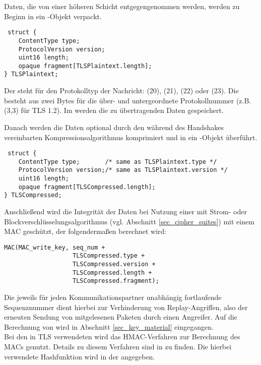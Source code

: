 Daten, die von einer höheren Schicht entgegengenommen werden, werden zu Beginn in ein -Objekt verpackt. 

\begin{lstlisting}
 struct {
	ContentType type;  
	ProtocolVersion version; 
	uint16 length;
	opaque fragment[TLSPlaintext.length];
} TLSPlaintext;
\end{lstlisting}

%

Der  steht für den Protokolltyp der Nachricht: \changecipherspecprotocol{} (20), \alertprotocol{} (21), \handshakeprotocol{} (22) oder \applicationdataprotocol{} (23). Die  besteht aus zwei Bytes für die über- und untergeordnete Protokollnummer (z.B. (3,3) für TLS 1.2). Im  werden die zu übertragenden Daten gespeichert.

Danach werden die Daten optional durch den während des Handshakes vereinbarten Kompressionsalgorithmus komprimiert und in ein -Objekt überführt.

\begin{lstlisting}
 struct {
	ContentType type;       /* same as TLSPlaintext.type */
	ProtocolVersion version;/* same as TLSPlaintext.version */
	uint16 length;
	opaque fragment[TLSCompressed.length];
} TLSCompressed;
\end{lstlisting}

Anschließend wird die Integrität der Daten bei Nutzung einer \ciphersuite{} mit Strom- oder Blockverschlüsselungsalgorithmus (vgl. Abschnitt \ref{sec_cipher_suites}) mit einem MAC geschützt, der folgendermaßen berechnet wird:
\begin{lstlisting}
MAC(MAC_write_key, seq_num +
				   TLSCompressed.type +
				   TLSCompressed.version +
				   TLSCompressed.length +
				   TLSCompressed.fragment);
\end{lstlisting}
Die jeweils für jeden Kommunikationspartner unabhängig fortlaufende Sequenznummer  dient hierbei zur Verhinderung von Replay-Angriffen, also der erneuten Sendung von mitgelesenen Paketen durch einen Angreifer. Auf die Berechnung von  wird in Abschnitt \ref{sec_key_material} eingegangen.\\
Bei den in TLS verwendeten \ciphersuites{} wird das HMAC-Verfahren zur Berechnung des MACs genutzt. Details zu diesem Verfahren sind in \cite{hmac97} zu finden. Die hierbei verwendete Hashfunktion wird in der \ciphersuite{} angegeben. 

